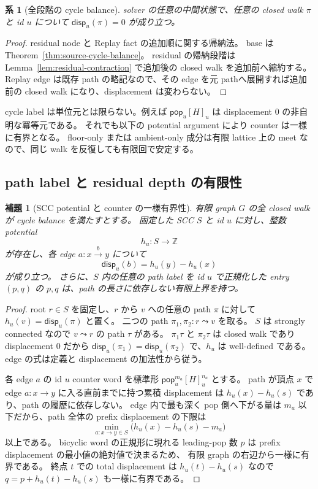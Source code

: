 \documentclass[uplatex,dvipdfmx,a4paper,10.5pt]{jsarticle}
\theoremstyle{jpplain}
\newtheorem{lemma}[definition]{補題}
\newtheorem{corollary}[definition]{系}
\newcommand{\takeop}[2]{[#1]_{#2}}
\newcommand{\popop}[1]{\mathsf{pop}_{#1}}
\newcommand{\disp}{\mathsf{disp}}
\begin{document}
\begin{corollary}[全段階の cycle balance]\label{cor:all-stage-balance}
solver の任意の中間状態で、任意の closed walk $\pi$ と id $u$ について $\disp_u(\pi)=0$ が成り立つ。
\end{corollary}

\begin{proof}
residual node と Replay fact の追加順に関する帰納法。
base は Theorem~\ref{thm:source-cycle-balance}。
residual の帰納段階は Lemma~\ref{lem:residual-contraction} で追加後の closed walk を追加前へ縮約する。
Replay edge は既存 path の略記なので、その edge を元 pathへ展開すれば追加前の closed walk になり、displacement は変わらない。
\end{proof}

cycle label は単位元とは限らない。例えば $\popop{u}\takeop{H}{u}$ は displacement 0 の非自明な冪等元である。
それでも以下の potential argument により counter は一様に有界となる。
floor-only または ambient-only 成分は有限 lattice 上の meet なので、同じ walk を反復しても有限回で安定する。

\subsection{path label と residual depth の有限性}

\begin{lemma}[SCC potential と counter の一様有界性]\label{lem:scc-potential}
有限 graph $G$ の全 closed walk が cycle balance を満たすとする。
固定した SCC $S$ と id $u$ に対し、整数 potential
\[
  h_u:S\to\mathbb Z
\]
が存在し、各 edge $a:x\xrightarrow{b}y$ について
\[
  \disp_u(b)=h_u(y)-h_u(x)
\]
が成り立つ。
さらに、$S$ 内の任意の path label を id $u$ で正規化した entry $(p,q)$ の $p,q$ は、path の長さに依存しない有限上界を持つ。
\end{lemma}

\begin{proof}
root $r\in S$ を固定し、$r$ から $v$ への任意の path $\pi$ に対して
$h_u(v)=\disp_u(\pi)$ と置く。
二つの path $\pi_1,\pi_2:r\leadsto v$ を取る。
$S$ は strongly connected なので $v\leadsto r$ の path $\tau$ がある。
$\pi_1\tau$ と $\pi_2\tau$ は closed walk であり displacement 0 だから
$\disp_u(\pi_1)=\disp_u(\pi_2)$ で、$h_u$ は well-defined である。
edge の式は定義と displacement の加法性から従う。

各 edge $a$ の id $u$ counter word を標準形
$\popop{u}^{m_a}\takeop{H}{u}^{n_a}$ とする。
path が頂点 $x$ で edge $a:x\to y$ に入る直前までに持つ累積 displacement は
$h_u(x)-h_u(s)$ であり、path の履歴に依存しない。
edge 内で最も深く pop 側へ下がる量は $m_a$ 以下だから、path 全体の prefix displacement の下限は
\[
  \min_{a:x\to y\in S}\bigl(h_u(x)-h_u(s)-m_a\bigr)
\]
以上である。
bicyclic word の正規形に現れる leading-pop 数 $p$ は prefix displacement の最小値の絶対値で決まるため、
有限 graph の右辺から一様に有界である。
終点 $t$ での total displacement は $h_u(t)-h_u(s)$ なので
$q=p+h_u(t)-h_u(s)$ も一様に有界である。
\end{proof}
\end{document}
